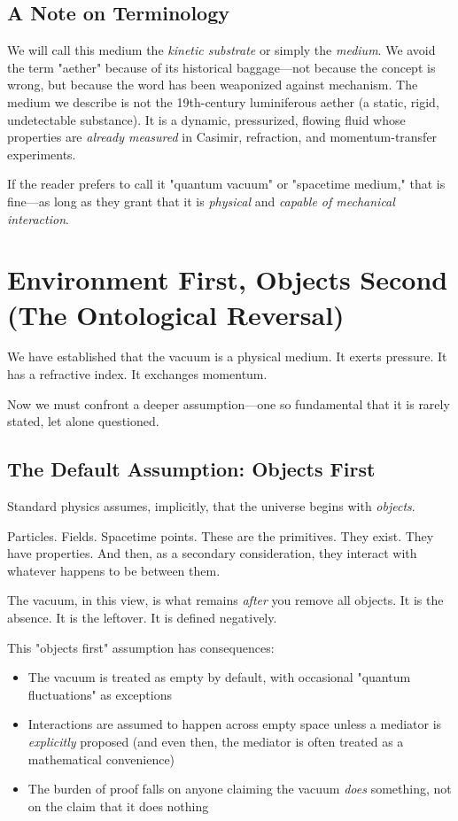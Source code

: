 \documentclass[12pt, a4paper]{article}
\begin{document}
\subsection{A Note on Terminology}
\label{subsec:terminology}

We will call this medium the \textit{kinetic substrate} or simply the \textit{medium}. We avoid the term "aether" because of its historical baggage—not because the concept is wrong, but because the word has been weaponized against mechanism. The medium we describe is not the 19th-century luminiferous aether (a static, rigid, undetectable substance). It is a dynamic, pressurized, flowing fluid whose properties are \textit{already measured} in Casimir, refraction, and momentum-transfer experiments.

If the reader prefers to call it "quantum vacuum" or "spacetime medium," that is fine—as long as they grant that it is \textit{physical} and \textit{capable of mechanical interaction}.

\section{Environment First, Objects Second (The Ontological Reversal)}
\label{sec:environment_first}

We have established that the vacuum is a physical medium. It exerts pressure. It has a refractive index. It exchanges momentum.

Now we must confront a deeper assumption—one so fundamental that it is rarely stated, let alone questioned.

\subsection{The Default Assumption: Objects First}
\label{subsec:objects_first}

Standard physics assumes, implicitly, that the universe begins with \textit{objects}.

Particles. Fields. Spacetime points. These are the primitives. They exist. They have properties. And then, as a secondary consideration, they interact with whatever happens to be between them.

The vacuum, in this view, is what remains \textit{after} you remove all objects. It is the absence. It is the leftover. It is defined negatively.

This "objects first" assumption has consequences:

\begin{itemize}
    \item The vacuum is treated as empty by default, with occasional "quantum fluctuations" as exceptions
    \item Interactions are assumed to happen across empty space unless a mediator is \textit{explicitly} proposed (and even then, the mediator is often treated as a mathematical convenience)
    \item The burden of proof falls on anyone claiming the vacuum \textit{does} something, not on the claim that it does nothing
\end{itemize}
\end{document}
